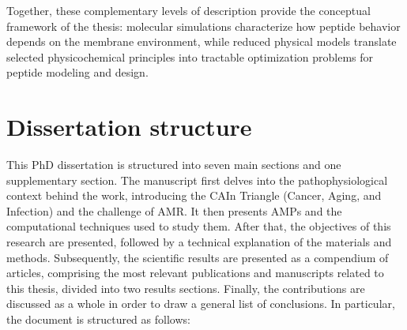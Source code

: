 Together, these complementary levels of description provide the conceptual framework of the thesis: molecular simulations characterize how peptide behavior depends on the membrane environment, while reduced physical models translate selected physicochemical principles into tractable optimization problems for peptide modeling and design.

\section{Dissertation structure}

This PhD dissertation is structured into seven main sections and one supplementary section. The manuscript first delves into the pathophysiological context behind the work, introducing the CAIn Triangle (Cancer, Aging, and Infection) and the challenge of AMR. It then presents AMPs and the computational techniques used to study them. After that, the objectives of this research are presented, followed by a technical explanation of the materials and methods. Subsequently, the scientific results are presented as a compendium of articles, comprising the most relevant publications and manuscripts related to this thesis, divided into two results sections. Finally, the contributions are discussed as a whole in order to draw a general list of conclusions. In particular, the document is structured as follows:
